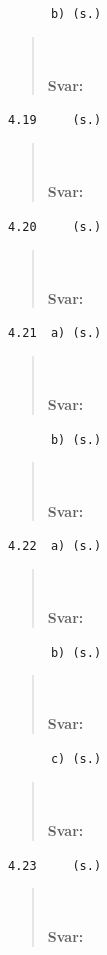 \documentclass[a4paper]{article}
\newcommand{\tskcol}[1]{\textcolor{tskcol}{#1}}
\begin{document}
\texttt{\tskcol{~~~~~~b) (s.)}}
\begin{quotation}
	\noindent
	\\ \\
	\textbf{Svar:}
\end{quotation}

\texttt{\tskcol{4.19~~~~ (s.)}}
\begin{quotation}
	\noindent
	\\ \\
	\textbf{Svar:}
\end{quotation}

\texttt{\tskcol{4.20~~~~ (s.)}}
\begin{quotation}
	\noindent
	\\ \\
	\textbf{Svar:}
\end{quotation}

\texttt{\tskcol{4.21~~a) (s.)}}
\begin{quotation}
	\noindent
	\\ \\
	\textbf{Svar:}
\end{quotation}

\texttt{\tskcol{~~~~~~b) (s.)}}
\begin{quotation}
	\noindent
	\\ \\
	\textbf{Svar:}
\end{quotation}

\texttt{\tskcol{4.22~~a) (s.)}}
\begin{quotation}
	\noindent
	\\ \\
	\textbf{Svar:}
\end{quotation}

\texttt{\tskcol{~~~~~~b) (s.)}}
\begin{quotation}
	\noindent
	\\ \\
	\textbf{Svar:}
\end{quotation}

\texttt{\tskcol{~~~~~~c) (s.)}}
\begin{quotation}
	\noindent
	\\ \\
	\textbf{Svar:}
\end{quotation}

\texttt{\tskcol{4.23~~~~ (s.)}}
\begin{quotation}
	\noindent
	\\ \\
	\textbf{Svar:}
\end{quotation}
\end{document}
